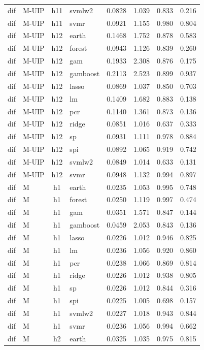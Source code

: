 \begin{ThreePartTable}
\begin{longtable}[t]{llclcccc}
dif & M-UIP & h11 & svmlw2 & 0.0828 & 1.039 & 0.833 & 0.216\\
dif & M-UIP & h11 & svmr & 0.0921 & 1.155 & 0.980 & 0.804\\
\addlinespace
dif & M-UIP & h12 & earth & 0.1468 & 1.752 & 0.878 & 0.583\\
dif & M-UIP & h12 & forest & 0.0943 & 1.126 & 0.839 & 0.260\\
dif & M-UIP & h12 & gam & 0.1933 & 2.308 & 0.876 & 0.175\\
dif & M-UIP & h12 & gamboost & 0.2113 & 2.523 & 0.899 & 0.937\\
dif & M-UIP & h12 & lasso & 0.0869 & 1.037 & 0.850 & 0.703\\
dif & M-UIP & h12 & lm & 0.1409 & 1.682 & 0.883 & 0.138\\
dif & M-UIP & h12 & pcr & 0.1140 & 1.361 & 0.873 & 0.136\\
dif & M-UIP & h12 & ridge & 0.0851 & 1.016 & 0.637 & 0.333\\
dif & M-UIP & h12 & sp & 0.0931 & 1.111 & 0.978 & 0.884\\
dif & M-UIP & h12 & spi & 0.0892 & 1.065 & 0.919 & 0.742\\
dif & M-UIP & h12 & svmlw2 & 0.0849 & 1.014 & 0.633 & 0.131\\
dif & M-UIP & h12 & svmr & 0.0948 & 1.132 & 0.994 & 0.897\\
\addlinespace
dif & M & h1 & earth & 0.0235 & 1.053 & 0.995 & 0.748\\
dif & M & h1 & forest & 0.0250 & 1.119 & 0.997 & 0.474\\
dif & M & h1 & gam & 0.0351 & 1.571 & 0.847 & 0.144\\
dif & M & h1 & gamboost & 0.0459 & 2.053 & 0.843 & 0.136\\
dif & M & h1 & lasso & 0.0226 & 1.012 & 0.946 & 0.825\\
dif & M & h1 & lm & 0.0236 & 1.056 & 0.920 & 0.860\\
dif & M & h1 & pcr & 0.0238 & 1.066 & 0.869 & 0.814\\
dif & M & h1 & ridge & 0.0226 & 1.012 & 0.938 & 0.805\\
dif & M & h1 & sp & 0.0226 & 1.012 & 0.844 & 0.316\\
dif & M & h1 & spi & 0.0225 & 1.005 & 0.698 & 0.157\\
dif & M & h1 & svmlw2 & 0.0227 & 1.018 & 0.943 & 0.844\\
dif & M & h1 & svmr & 0.0236 & 1.056 & 0.994 & 0.662\\
\addlinespace
dif & M & h2 & earth & 0.0325 & 1.035 & 0.975 & 0.815\\

\end{longtable}
\end{ThreePartTable}
